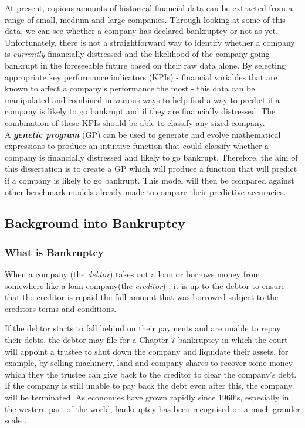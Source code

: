 \documentclass[11pt]{article}
\begin{document}
At present, copious amounts of historical financial data can be extracted from a range of small, medium and large companies. Through looking at some of this data, we can see whether a company has declared bankruptcy or not as yet. Unfortunately, there is not a straightforward way to identify whether a company is \textit{currently} financially distressed and the likelihood of the company going bankrupt in the foreseeable future based on their raw data alone. By selecting appropriate key performance indicators (KPIs) - financial variables that are known to affect a company's performance the most - this data can be manipulated and combined in various ways to help find a way to predict if a company is likely to go bankrupt and if they are financially distressed. The combination of these KPIs should be able to classify any sized company. \\
A \textbf{\textit{genetic program}} (GP) can be used to generate and evolve mathematical expressions to produce an intuitive function that could classify whether a company is financially distressed and likely to go bankrupt. Therefore, the aim of this dissertation is to create a GP which will produce a function that will predict if a company is likely to go bankrupt. This model will then be compared against other benchmark models already made to compare their predictive accuracies. \\
\subsection{Background into Bankruptcy}\label{subsec:intro2B}%
\subsubsection{What is Bankruptcy}\label{subsubsec:bankdef}
When a company (the \textit{debtor}) takes out a loan or borrows money from somewhere like a loan company(the \textit{creditor}) , it is up to the debtor to ensure that the creditor is repaid the full amount that was borrowed subject to the creditors terms and conditions.

If the debtor starts to fall behind on their payments and are unable to repay their debts, the debtor may file for a Chapter 7 bankruptcy in which the court will appoint a trustee to shut down the company and liquidate their assets, for example, by selling machinery, land and company shares to recover some money which they the trustee can give back to the creditor to clear the company's debt. If the company is still unable to pay back the debt even after this, the company will be terminated. As economies have grown rapidly since 1960's, especially in the western part of the world, bankruptcy has been recognised on a much grander scale \cite{ref-three}.
\end{document}
